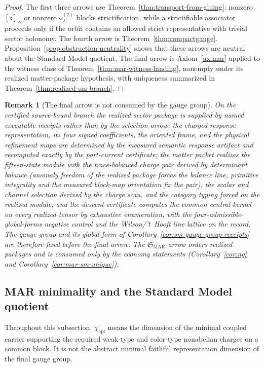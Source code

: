 \documentclass[11pt]{article}
\newtheorem{remark}[theorem]{Remark}
\begin{document}
\begin{proof}
The first three arrows are Theorem~\ref{thm:transport-from-gluing}: nonzero \([z]_\Sigma\) or
nonzero \(o^{(2)}_\Sigma\) blocks strictification, while a strictifiable associator proceeds only if the
orbit contains an allowed strict representative with trivial sector holonomy. The fourth arrow is Theorem~\ref{thm:compactgauge}.
Proposition~\ref{prop:obstruction-neutrality} shows that these arrows are neutral about the Standard
Model quotient. The final arrow is Axiom~\ref{ax:mar}
applied to the witness class of Theorem~\ref{thm:mar-witness-landing}, nonempty under its realized
matter-package hypothesis, with uniqueness
summarized in Theorem~\ref{thm:realized-sm-branch}.
\end{proof}

\begin{remark}[The final arrow is not consumed by the gauge group]
\label{rem:mar-arrow-scope}
On the certified source-bound branch the realized sector package is supplied
by named executable receipts rather than by the selection arrow: the charged
response representation, its four signed coefficients, the oriented frame,
and the physical refinement maps are determined by the measured semantic
response artifact and recomputed exactly by the port-current certificate;
the matter packet realizes the fifteen-state module with the trace-balanced
charge pair derived by determinant balance (anomaly freedom of the realized
package forces the balance line, primitive integrality and the measured
block-map orientation fix the pair), the scalar and channel selection
derived by the charge scan, and the category typing forced on the realized
module; and the descent certificate computes the common central kernel on
every realized tensor by exhaustive enumeration, with the
four-admissible-global-forms negative control and the Wilson/'t~Hooft line
lattice on the record. The gauge group and its global form of
Corollary~\ref{cor:sm-gauge-group-receipts} are therefore fixed before the
final arrow. The \(\mathfrak S_{\mathrm{MAR}}\) arrow orders realized
packages and is consumed only by the economy statements
(Corollary~\ref{cor:ng} and Corollary~\ref{cor:mar-sm-unique}).
\end{remark}

\subsection{MAR minimality and the Standard Model quotient}

Throughout this subsection, $\chi_{\mathrm{cpl}}$ means the dimension of the minimal coupled carrier supporting the required weak-type and color-type nonabelian charges on a common block. It is not the abstract minimal faithful representation dimension of the final gauge group.
\end{document}

